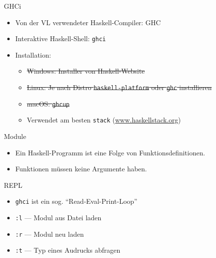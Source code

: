 \documentclass{beamer}
\begin{document}
\begin{frame}[fragile]{GHCi}

        \begin{itemize}
                \item Von der VL verwendeter Haskell-Compiler: GHC
                \item Interaktive Haskell-Shell: \texttt{ghci}
                \item Installation:
                \begin{itemize}
                  \item \sout{Windows: Installer von Haskell-Website}
                  \item \sout{Linux: Je nach Distro \texttt{haskell-platform} oder \texttt{ghc} installieren}
                  \item \sout{macOS: \texttt{ghcup}}
                  \item Verwendet am besten \texttt{stack} (\href{https://www.haskellstack.org}{www.haskellstack.org})
                \end{itemize}
        \end{itemize}
\end{frame}

\begin{frame}{Module}

        \begin{itemize}
                \item Ein Haskell-Programm ist eine Folge von Funktionsdefinitionen.
                \item Funktionen müssen keine Argumente haben.
        \end{itemize}
\end{frame}

\begin{frame}{REPL}

        \begin{itemize}
                \item \texttt{ghci} ist ein sog. \enquote{Read-Eval-Print-Loop}
                \item \texttt{:l} --- Modul aus Datei laden
                \item \texttt{:r} --- Modul neu laden
                \item \texttt{:t} --- Typ eines Audrucks abfragen
        \end{itemize}
\end{frame}
\end{document}
